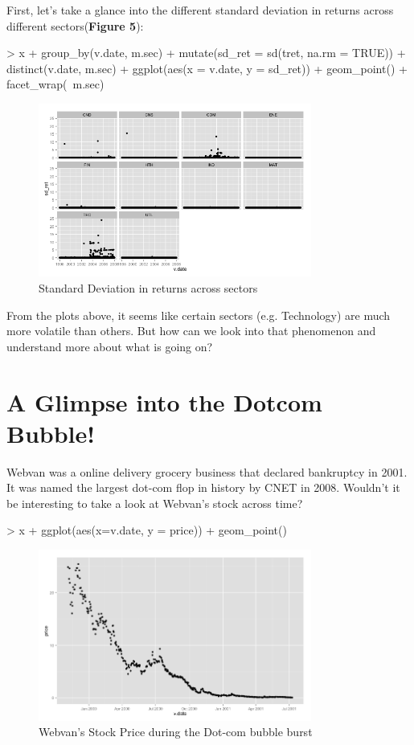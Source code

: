 First, let's take a glance into the different standard deviation in returns across different sectors(\textbf{Figure 5}): 

\begin{example}
> x  %
+   group_by(v.date, m.sec)  %
+   mutate(sd_ret = sd(tret, na.rm = TRUE)) %
+   distinct(v.date, m.sec) %
+   ggplot(aes(x = v.date, y = sd_ret)) + geom_point() + facet_wrap(~m.sec)
\end{example}
\begin{figure}[h!]
  \centering
    \includegraphics[width=0.8\textwidth]{VOL1}
  \caption{Standard Deviation in returns across sectors}
\end{figure}

\noindent From the plots above, it seems like certain sectors (e.g. Technology) are much more volatile than others. But how can we look into that phenomenon and understand more about what is going on? 

\section{A Glimpse into the Dotcom Bubble!}

\noindent Webvan was a online delivery grocery business that declared bankruptcy in 2001. It was named the largest dot-com flop in history by CNET in 2008. Wouldn't it be interesting to take a look at Webvan's stock across time?

\begin{example}
> x %
+   ggplot(aes(x=v.date, y = price)) + geom_point()
\end{example}
\begin{figure}[h!]
  \centering
    \includegraphics[width=0.8\textwidth]{WEBVAN}
  \caption{Webvan's Stock Price during the Dot-com bubble burst}
\end{figure}

